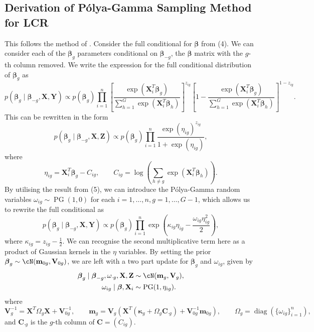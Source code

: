 \documentclass[11pt]{article}
\def\pg{\operatorname{PG}}
\def\diag{\operatorname{diag}}
\def\boldm{\mathbf{m}}
\def\boldC{\mathbf{C}}
\def\boldV{\mathbf{V}}
\def\boldX{\mathbf{X}}
\def\boldY{\mathbf{Y}}
\def\boldZ{\mathbf{Z}}
\def\bsbet{\boldsymbol{\beta}}
\def\bskap{\boldsymbol{\kappa}}
\theoremstyle{plain}
\theoremstyle{definition}
\begin{document}
\subsection{Derivation of Pólya-Gamma Sampling Method for LCR}
This follows the method of \cite{polson_bayesian_2013}. Consider the full conditional for $\bsbet$ from (4). We can consider each of the $\bsbet_g$ parameters conditional on $\bsbet_{-g}$, the $\bsbet$ matrix with the $g$-th column removed. We write the expression for the full conditional distribution of $\bsbet_g$ as
\begin{equation}\label{beta_fc2}
p(\bsbet_g \mid \bsbet_{-g}, \boldX, \boldY) \propto p(\bsbet_g) \prod_{i=1}^n \left[  \frac{\exp(\boldX_i^T \bsbet_g)}{\sum_{h=1}^G \exp(\boldX_i^T \bsbet_h)}\right]^{z_{ig}}\left[1- \frac{\exp(\boldX_i^T \bsbet_g)}{\sum_{h=1}^G \exp(\boldX_i^T \bsbet_h)}\right]^{1-z_{ig}}.
\end{equation}
This can be rewritten in the form
\[
p(\bsbet_g \mid \bsbet_{-g}, \boldX, \boldZ) \propto p(\bsbet_g) \prod_{i=1}^n \frac{\exp(\eta_{ig})^{z_{ig}}}{1+\exp(\eta_{ig})},
\]
where
\[
\eta_{ig} = \boldX_i^T\bsbet_g - C_{ig}, \qquad C_{ig} = \log\left( \sum_{h \neq g} \exp(\boldX_i^T \bsbet_h) \right).
\]
By utilising the result from (5), we can introduce the Pólya-Gamma random variables $\omega_{ig} \sim \pg(1,0)$ for each $i = 1,\dots,n, g = 1,\dots,G-1$, which allows us to rewrite the full conditional as 
\[
p(\bsbet_g \mid \bsbet_{-g},\boldX, \boldY) 
\propto p(\bsbet_g) \prod_{i=1}^n \exp\left( \kappa_{ig}\eta_{ig} - \frac{\omega_{ig}\eta_{ig}^2}{2} \right),
\]
where $\kappa_{ig} = z_{ig} - \frac{1}{2}$. We can recognise the second multiplicative term here as a product of Gaussian kernels in the $\eta$ variables. By setting the prior $\bsbet_g \sim \cN(\mathbf{m}_{0g}, \mathbf{V}_{0g})$, we are left with a two part update for $\bsbet_g$ and $\omega_{ig}$, given by
 \begin{equation}
 \begin{aligned}
    \bsbet_g \mid \bsbet_{-g}, \omega_{\cdot g}, \boldX,\boldZ  &\sim \cN(\mathbf{m}_g, \mathbf{V}_g),\\
    \omega_{ig} \mid \bsbet, \boldX_i &\sim \pg(1,\eta_{ig}).
\end{aligned}
\end{equation}
where
\[
\mathbf{V}_g^{-1} = \boldX^T \Omega_g \boldX + \boldV_{0g}^{-1}, \qquad \boldm_g = \boldV_g \left( \boldX^T(\bskap_g+ \Omega_g\boldC_{\cdot g}) + \boldV_{0g}^{-1}\boldm_{0g} \right), \qquad \Omega_g = \diag(\{\omega_{ig}\}_{i=1}^n),
\]
and $\boldC_{\cdot g}$ is the $g$-th column of $\boldC = (C_{ig})$.

 
       
\end{document}
